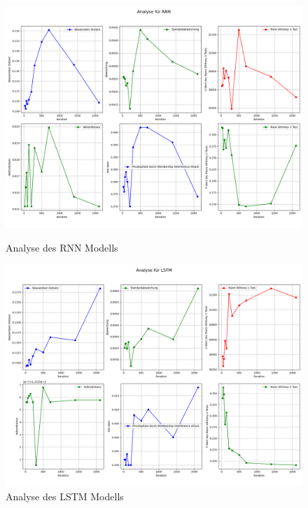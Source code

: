 \begin{figure}[ht]
    \centering
    \begin{minipage}{0.5\textwidth}
        \centering
        \includegraphics[width=\textwidth]{includes/figures/graphs/RNN_analysis.png}
        \caption{Analyse des RNN Modells}
        \label{fig:graphs_rnn_analysis}
    \end{minipage}\hfill
    \begin{minipage}{0.5\textwidth}
        \centering
        \includegraphics[width=\textwidth]{includes/figures/graphs/LSTM_analysis.png}
        \caption{Analyse des LSTM Modells}
        \label{fig:graphs_lstm_analysis}
    \end{minipage}
\end{figure}




